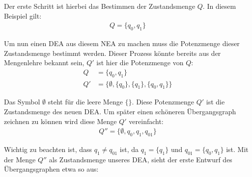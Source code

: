 \begin{center}
\end{center}

\begin{flushleft}
Der erste Schritt ist hierbei das Bestimmen der Zustandsmenge $Q$.
In diesem Beispiel gilt:
\begin{align}
    Q=\{q_0,q_1\}
\end{align}

Um nun einen DEA aus diesem NEA zu machen muss die Potenzmenge
dieser Zustandsmenge bestimmt werden. Dieser Prozess könnte
bereits aus der Mengenlehre bekannt sein, $Q'$ ist hier die
Potenzmenge von $Q$:
\begin{align}
    Q &=\{q_0,q_1\} \\
    Q' &=\{\emptyset,\{q_0\},\{q_1\},\{q_0,q_1\}\}
\end{align}

Das Symbol $\emptyset$ steht für die leere Menge $\{\}$.
Diese Potenzmenge $Q'$ ist die Zustandsmenge des neuen DEA.
Um später einen schöneren Übergangsgraph zeichnen zu können
wird diese Menge $Q'$ vereinfacht:
\begin{align}
    Q'' =\{\emptyset,q_0,q_1,q_{01}\}
\end{align}

Wichtig zu beachten ist, dass $q_1 \neq q_{01}$ ist,
da $q_1=\{q_1\}$ und $q_{01}=\{q_0,q_1\}$ ist.
Mit der Menge $Q''$ als Zustandsmenge unseres DEA,
sieht der erste Entwurf des Übergangsgraphen etwa so aus:
\end{flushleft}
    
\begin{center}
\end{center}

